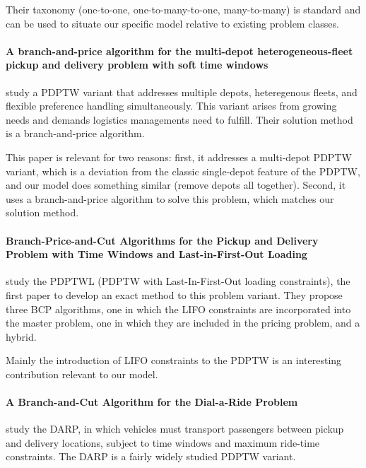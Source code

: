 \documentclass[preprint,11pt,authoryear]{elsarticle}
\begin{document}
Their taxonomy (one-to-one, one-to-many-to-one, many-to-many) is standard and can be used to situate our specific model relative to existing problem classes.


\paragraph{\textbf{A branch-and-price algorithm for the multi-depot heterogeneous-fleet pickup and delivery problem with soft time windows}}

\citet{bettinelliBranchandpriceAlgorithmMultidepot2014} study a PDPTW variant that addresses multiple depots, heteregenous fleets, and flexible preference handling simultaneously. This variant arises from 
growing needs and demands logistics managements need to fulfill. Their solution method is a branch-and-price algorithm.

This paper is relevant for two reasons: first, it addresses a multi-depot PDPTW variant, which is a deviation from the classic single-depot feature of the PDPTW, and our model does something similar (remove depots all together). 
Second, it uses a branch-and-price algorithm to solve this problem, which matches our solution method.


\paragraph{\textbf{Branch-Price-and-Cut Algorithms for the Pickup and Delivery Problem with Time Windows and Last-in-First-Out Loading}}

\citet{cherkeslyBranchPriceandCutAlgorithmsPickup2015} study the PDPTWL (PDPTW with Last-In-First-Out loading constraints), the first paper to develop an exact method to this problem variant. 
They propose three BCP algorithms, one in which the LIFO constraints are incorporated into the master problem, one in which they are included in the pricing problem, and a hybrid.

Mainly the introduction of LIFO constraints to the PDPTW is an interesting contribution relevant to our model.


\paragraph{\textbf{A Branch-and-Cut Algorithm for the Dial-a-Ride Problem}}

\citet{cordeauBranchandCutAlgorithmDialaRide2006} study the DARP, in which vehicles must transport passengers between pickup and delivery locations,
subject to time windows and maximum ride-time constraints. The DARP is a fairly widely studied PDPTW variant.
\end{document}
